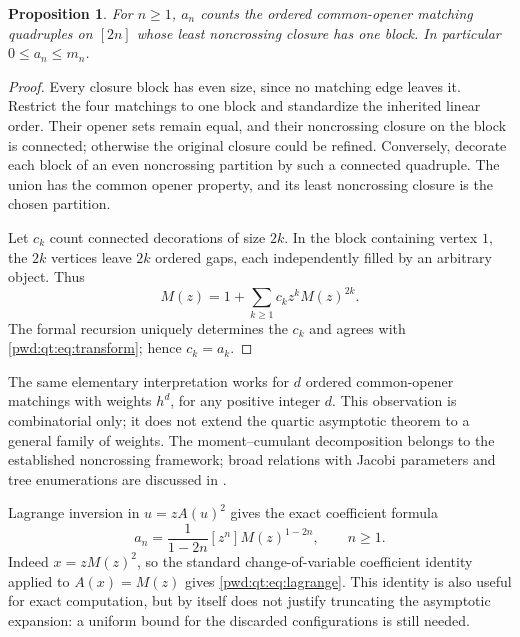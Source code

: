 \documentclass[11pt,letterpaper]{article}
\numberwithin{equation}{section}
\newtheorem{proposition}[theorem]{Proposition}
\theoremstyle{remark}\newtheorem{remark}[theorem]{Remark}
\begin{document}
\begin{proposition}\label{pwd:qt:prop:count}
For $n\ge1$, $a_n$ counts the ordered common-opener matching quadruples on $[2n]$ whose least noncrossing closure has one block. In particular $0\le a_n\le m_n$.
\end{proposition}
\begin{proof}
Every closure block has even size, since no matching edge leaves it. Restrict the four matchings to one block and standardize the inherited linear order. Their opener sets remain equal, and their noncrossing closure on the block is connected; otherwise the original closure could be refined. Conversely, decorate each block of an even noncrossing partition by such a connected quadruple. The union has the common opener property, and its least noncrossing closure is the chosen partition.

Let $c_k$ count connected decorations of size $2k$. In the block containing vertex $1$, the $2k$ vertices leave $2k$ ordered gaps, each independently filled by an arbitrary object. Thus
\[
 M(z)=1+\sum_{k\ge1}c_kz^kM(z)^{2k}.
\]
The formal recursion uniquely determines the $c_k$ and agrees with \eqref{pwd:qt:eq:transform}; hence $c_k=a_k$.
\end{proof}
The same elementary interpretation works for $d$ ordered common-opener matchings with weights $h^d$, for any positive integer $d$. This observation is combinatorial only; it does not extend the quartic asymptotic theorem to a general family of weights. The moment--cumulant decomposition belongs to the established noncrossing framework; broad relations with Jacobi parameters and tree enumerations are discussed in \cite{mlotkowski,defantlee}.

Lagrange inversion in $u=zA(u)^2$ gives the exact coefficient formula
\begin{equation}\label{pwd:qt:eq:lagrange}
 a_n=\frac1{1-2n}[z^n]M(z)^{1-2n},\qquad n\ge1.
\end{equation}
Indeed $x=zM(z)^2$, so the standard change-of-variable coefficient identity applied to $A(x)=M(z)$ gives \eqref{pwd:qt:eq:lagrange}. This identity is also useful for exact computation, but by itself does not justify truncating the asymptotic expansion: a uniform bound for the discarded configurations is still needed.
\end{document}
